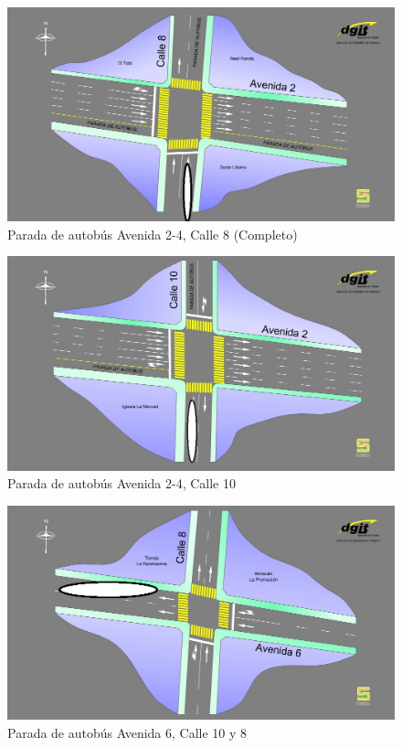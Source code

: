 \begin{figure}[H]
	\centering
	\includegraphics[scale=0.40]{images/Parada_A2-04Ca08.jpg}
	\caption{Parada de autob\'{u}s Avenida 2-4, Calle 8 (Completo)}
	\label{fig:stopAv0204Ca8}
\end{figure}

\begin{figure}[H]
	\centering
	\includegraphics[scale=0.40]{images/Parada_A2-04Ca10.jpg}
	\caption{Parada de autob\'{u}s Avenida 2-4, Calle 10}
	\label{fig:stopAv0204Ca10}
\end{figure}

\begin{figure}[H]
	\centering
	\includegraphics[scale=0.40]{images/Parada_A6Ca10-8.jpg}
	\caption{Parada de autob\'{u}s Avenida 6, Calle 10 y 8}
	\label{fig:stopAv6Ca1008}
\end{figure}

